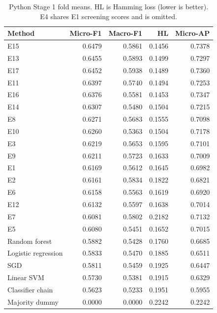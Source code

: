 \begin{table}[htbp]
\centering\small
\caption{Python Stage 1 fold means. HL is Hamming loss (lower is better). E4 shares E1 screening scores and is omitted.}\label{tab:pythoncv}
\begin{tabular}{lrrrr}\toprule
Method & Micro-F1 & Macro-F1 & HL & Micro-AP\\\midrule
E15 & 0.6479 & 0.5861 & 0.1456 & 0.7378\\
E13 & 0.6455 & 0.5893 & 0.1499 & 0.7297\\
E17 & 0.6452 & 0.5938 & 0.1489 & 0.7360\\
E11 & 0.6397 & 0.5740 & 0.1494 & 0.7253\\
E16 & 0.6376 & 0.5581 & 0.1453 & 0.7347\\
E14 & 0.6307 & 0.5480 & 0.1504 & 0.7215\\
E8 & 0.6271 & 0.5683 & 0.1555 & 0.7098\\
E10 & 0.6260 & 0.5363 & 0.1504 & 0.7178\\
E3 & 0.6219 & 0.5653 & 0.1595 & 0.7101\\
E9 & 0.6211 & 0.5723 & 0.1633 & 0.7009\\
E1 & 0.6169 & 0.5612 & 0.1645 & 0.6982\\
E2 & 0.6161 & 0.5834 & 0.1822 & 0.6821\\
E6 & 0.6158 & 0.5563 & 0.1619 & 0.6920\\
E12 & 0.6132 & 0.5597 & 0.1638 & 0.7014\\
E7 & 0.6081 & 0.5802 & 0.2182 & 0.7132\\
E5 & 0.6080 & 0.5451 & 0.1652 & 0.7015\\
Random forest & 0.5882 & 0.5428 & 0.1760 & 0.6685\\
Logistic regression & 0.5833 & 0.5470 & 0.1885 & 0.6511\\
SGD & 0.5811 & 0.5459 & 0.1925 & 0.6447\\
Linear SVM & 0.5730 & 0.5381 & 0.1915 & 0.6329\\
Classifier chain & 0.5623 & 0.5233 & 0.1951 & 0.5955\\
Majority dummy & 0.0000 & 0.0000 & 0.2242 & 0.2242\\
\bottomrule\end{tabular}
\end{table}

